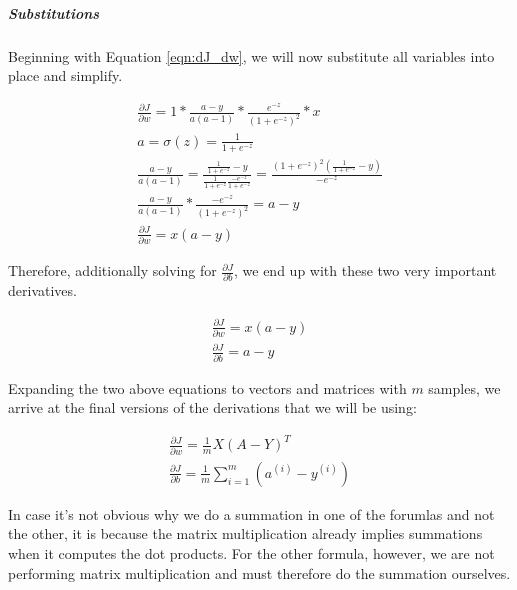 \documentclass{article}
\newcommand{\mysubparagraph}[1]{\subparagraph{#1}\mbox{}}
\begin{document}
\mysubparagraph{Substitutions}

Beginning with Equation \ref{eqn:dJ_dw}, we will now substitute all variables into place and simplify.

\begin{gather}
\frac{\partial{J}}{\partial{w}} = 1 * \frac{a-y}{a(a-1)} * \frac{e^{-z}}{(1+e^{-z})^{2}} * x \\
%
a = \sigma(z) = \frac{1}{1 + e^{-z}} \\
%
\frac{a-y}{a(a-1)} = \frac{\frac{1}{1 + e^{-z}} - y}{\frac{1}{1 + e^{-z}} \frac{-e^{-z}}{1 + e^{-z}}} = \frac{(1+e^{-z})^2 (\frac{1}{1 + e^{-z}} - y)}{-e^{-z}} \\
%
\frac{a-y}{a(a-1)} * \frac{-e^{-z}}{(1+e^{-z})^{2}} = a-y \\
%
\frac{\partial{J}}{\partial{w}} = x(a-y)
\end{gather}

Therefore, additionally solving for $\frac{\partial{J}}{\partial{b}}$, we end up with these two very important derivatives.

\begin{gather}
\frac{\partial{J}}{\partial{w}} = x(a-y) \\
%
\frac{\partial{J}}{\partial{b}} = a-y
\end{gather}

Expanding the two above equations to vectors and matrices with $m$ samples, we arrive at the final versions of the derivations that we will be using:

\begin{gather}
\frac{\partial{J}}{\partial{w}} = \frac{1}{m} X(A-Y)^{T} \\
%
\frac{\partial{J}}{\partial{b}} = \frac{1}{m} \sum_{i=1}^{m} (a^{(i)} - y^{(i)})
\end{gather}

In case it's not obvious why we do a summation in one of the forumlas and not the other, it is because the matrix multiplication already implies summations when it computes the dot products.  For the other formula, however, we are not performing matrix multiplication and must therefore do the summation ourselves.
\end{document}
